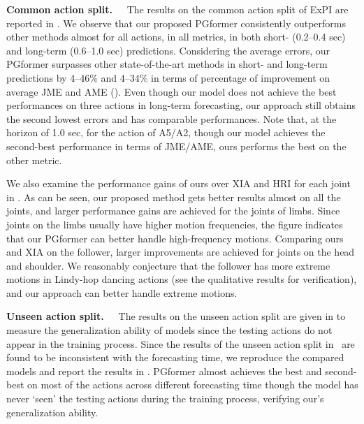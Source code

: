 \documentclass[10pt,twocolumn,letterpaper]{article}
\begin{document}
\vspace{1em}
\noindent\textbf{Common action split.~~}
The results on the common action split of ExPI are reported in .
We observe that our proposed PGformer consistently outperforms other methods almost for all actions, in all metrics, in both short- (0.2--0.4 sec) and long-term (0.6--1.0 sec) predictions. 
Considering the average errors, our PGformer surpasses other state-of-the-art methods in short- and long-term predictions by 4--46\% and 4--34\% in terms of percentage of improvement on average JME and AME ().
Even though our model does not achieve the best performances on three actions in long-term forecasting, our approach still obtains the second lowest errors and has comparable performances. 
Note that, at the horizon of 1.0 sec, for the action of A5/A2, though our model achieves the second-best performance in terms of JME/AME, ours performs the best on the other metric. 


We also examine the performance gains of ours over XIA and HRI for each joint in . 
As can be seen, our proposed method gets better results almost on all the joints, and larger performance gains are achieved for the joints of limbs. 
Since joints on the limbs usually have higher motion frequencies, the figure indicates that our PGformer can better handle high-frequency motions.
Comparing ours and XIA on the follower, larger improvements are achieved for joints on the head and shoulder. 
We reasonably conjecture that the follower has more extreme motions in Lindy-hop dancing actions (see the qualitative results for verification), and our approach can better handle extreme motions.


\vspace{1em}
\noindent\textbf{Unseen action split.~~}
The results on the unseen action split are given in  to measure the generalization ability of models since the testing actions do not appear in the training process. 
Since the results of the unseen action split in~\cite{guo2021multi} are found to be inconsistent with the forecasting time, we reproduce the compared models and report the results in . 
PGformer almost achieves the best and second-best on most of the actions across different forecasting time though the model has never `seen' the testing actions during the training process, verifying our's generalization ability.
\end{document}
